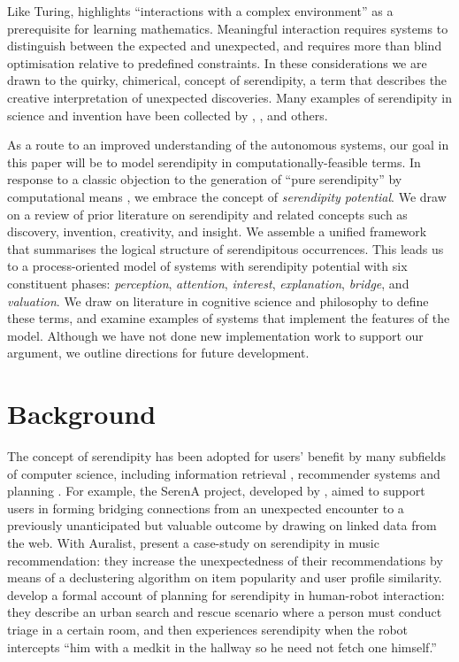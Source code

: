 Like Turing, \citet[p.~2015]{sloman2008well} highlights ``interactions with a complex environment'' as a prerequisite for learning mathematics.  Meaningful interaction requires systems to distinguish between the expected and unexpected, and requires more than blind optimisation relative to predefined constraints.  In these considerations we are drawn to the quirky, chimerical, concept of serendipity, a term that describes the creative interpretation of unexpected discoveries.  Many examples of serendipity in science and invention have been collected by \citet{van1994anatomy},
\citet{roberts}, and others.

As a route to an improved understanding of the autonomous systems, our goal in this paper will be to model serendipity in computationally-feasible terms. In response to a classic objection to the generation of ``pure serendipity'' by computational means \cite{van1994anatomy},  we embrace the concept of \emph{serendipity potential}.
We draw on a review of prior literature on serendipity and related concepts such as discovery, invention, creativity, and insight.  We assemble a unified framework that summarises the logical structure of serendipitous occurrences.
This leads us to a process-oriented model of systems with serendipity potential with six constituent phases:
\emph{perception}, \emph{attention}, \emph{interest}, \emph{explanation}, \emph{bridge}, and \emph{valuation}.
We draw on literature in cognitive science and philosophy to define these terms, and examine examples of systems that implement the features of the model.
Although we have not done new implementation work to support our argument, we outline directions for future development.

\section{Background} \label{sec:background}

The concept of serendipity has been adopted for users' benefit by many subfields of computer science, including information retrieval \cite{Toms2000, Andre:2009:XSP:1518701.1519009}, recommender systems \cite{kotkov2016survey} and planning \cite{muscettola1997board, chakraborti2015planning}. For example, the {\sf SerenA} project, developed by \citet{maxwell2012designing}, aimed to support users in forming bridging connections from an unexpected encounter to a previously unanticipated but valuable outcome by drawing on linked data from the web. With {\sf Auralist}, \citet{Zhang2011} present a case-study on serendipity in music recommendation: they increase the unexpectedness of their recommendations by means of a declustering algorithm on item popularity and user profile similarity. \citet{chakraborti2015planning} develop a formal account of planning for serendipity in human-robot interaction: they describe an urban search and rescue scenario where a person must conduct triage in a certain room, and then experiences serendipity when the robot intercepts ``him with a medkit in the hallway so he need not fetch one himself.''

